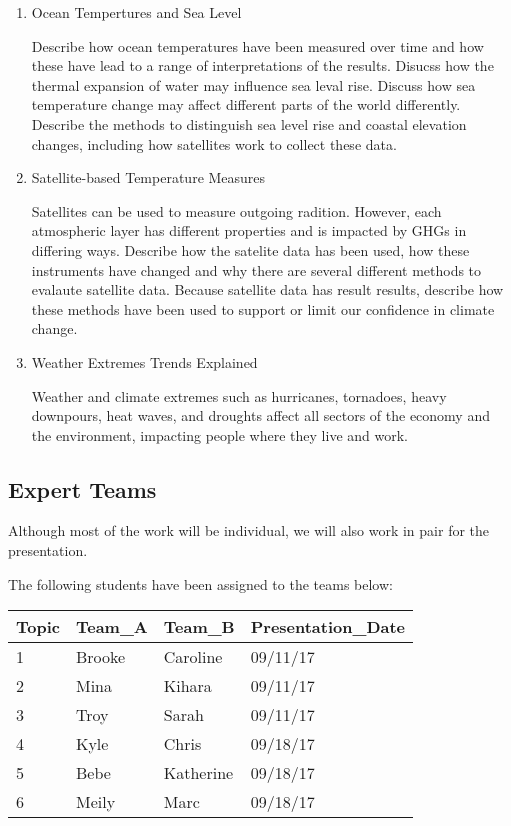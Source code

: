 \documentclass{article}\usepackage[]{graphicx}\usepackage[]{color}
\begin{document}
\begin{enumerate}
  \item Ocean Tempertures and Sea Level

Describe how ocean temperatures have been measured over time and how these have lead to a range of interpretations of the results. Disucss how the thermal expansion of water may influence sea leval rise. Discuss how sea temperature change may affect different parts of the world differently. Describe the methods to distinguish sea level rise and coastal elevation changes, including how satellites work to collect these data.  

  \item Satellite-based Temperature Measures
  
Satellites can be used to measure outgoing radition. However, each atmospheric layer has different properties and is impacted by GHGs in differing ways. Describe how the satelite data has been used, how these instruments have changed and why there are several different methods to evalaute satellite data. Because satellite data has result results, describe how these methods have been used to support or limit our confidence in climate change.
  
  \item Weather Extremes Trends Explained
  
Weather and climate extremes such as hurricanes, tornadoes, heavy downpours, heat waves, and droughts affect all sectors of the economy and the environment, impacting people where they live and work.  
  
\end{enumerate}

\subsection{Expert Teams}

Although most of the work will be individual, we will also work in pair for the presentation. 

The following students have been assigned to the teams below:

\begin{table}[ht]
\centering
\begin{tabular}{llll}
  \hline
Topic & Team\_A & Team\_B & Presentation\_Date \\ 
  \hline
1 & Brooke & Caroline & 09/11/17 \\ 
  2 & Mina & Kihara & 09/11/17 \\ 
  3 & Troy & Sarah & 09/11/17 \\ 
  4 & Kyle & Chris & 09/18/17 \\ 
  5 & Bebe & Katherine & 09/18/17 \\ 
  6 & Meily & Marc & 09/18/17 \\ 
   \hline
\end{tabular}
\end{table}
\end{document}
